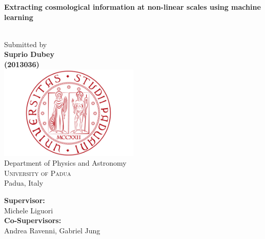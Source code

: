 \begin{titlepage}
\begin{center}

\vspace*{.2in}
\parbox{\textwidth}{\centering
\huge \textbf {Extracting cosmological information at non-linear scales using machine learning}
}\\[.2in]

\Large Submitted by \\
\vspace{.1in}
\Large \textbf{Suprio Dubey}\\
\textbf{(2013036)}\\[.5in]

\includegraphics[width=0.5\textwidth]{logo.jpg}\\[0.5in]
\Large{Department of Physics and Astronomy}\\
\normalsize
\textsc{University of Padua}\\
Padua, Italy \\
\vspace{0.2cm}

\vfill

\vspace{\fill}
\hfill
\begin{minipage}{0.4\textwidth}
    \raggedleft %
    \large
    \textbf{Supervisor:}\\
    Michele Liguori\\
    \vspace{0.2cm}
    \textbf{Co-Supervisors:}\\
    Andrea Ravenni, Gabriel Jung
\end{minipage}
 

\end{center}
\end{titlepage}



